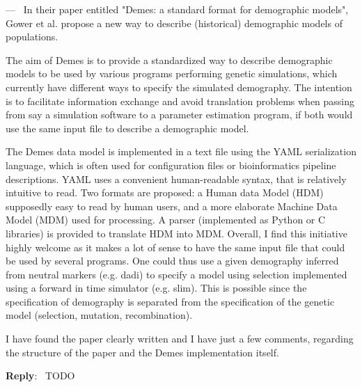 \documentclass[11pt]{article}
\newcounter{reviewer}
\newcounter{point}[reviewer]
\renewcommand{\thepoint}{\thereviewer.\arabic{point}}
\newenvironment{point}
   {\refstepcounter{point} \bigskip \noindent {\textbf{Reviewer~Point~\thepoint} } ---\ }
   {\par }
\newenvironment{reply}
   {\medskip \noindent \begin{sf}\textbf{Reply}:\  }
   {\medskip \end{sf}}
\begin{document}
\begin{point}
In their paper entitled "Demes: a standard format for demographic models",
Gower et al. propose a new way to describe (historical) demographic models of
populations.

The aim of Demes is to provide a standardized way to describe demographic
models to be used by various programs performing genetic simulations, which
currently have different ways to specify the simulated demography. The
intention is to facilitate information exchange and avoid translation problems
when passing from say a simulation software to a parameter estimation program,
if both would use the same input file to describe a demographic model.

The Demes data model is implemented in a text file using the YAML serialization
language, which is often used for configuration files or bioinformatics
pipeline descriptions. YAML uses a convenient human-readable syntax, that is
relatively intuitive to read. Two formats are proposed: a Human data Model
(HDM) supposedly easy to read by human users, and a more elaborate Machine Data
Model (MDM) used for processing. A parser (implemented as Python or C
libraries) is provided to translate HDM into MDM. Overall, I find this
initiative highly welcome as it makes a lot of sense to have the same input
file that could be used by several programs. One could thus use a given
demography inferred from neutral markers (e.g. dadi) to specify a model using
selection implemented using a forward in time simulator (e.g. slim). This is
possible since the specification of demography is separated from the
specification of the genetic model (selection, mutation, recombination).

I have found the paper clearly written and I have just a few comments,
regarding the structure of the paper and the Demes implementation itself.
\end{point}
\begin{reply}
TODO
\end{reply}
\end{document}
